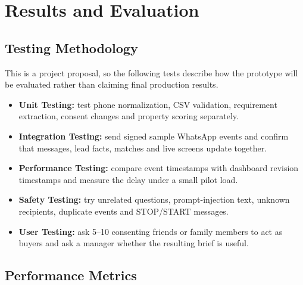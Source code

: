 \documentclass{tietreport}
\begin{document}
\chapter{Results and Evaluation}

\section{Testing Methodology}

This is a project proposal, so the following tests describe how the prototype
will be evaluated rather than claiming final production results.

\begin{itemize}
  \item \textbf{Unit Testing:} test phone normalization, CSV validation,
    requirement extraction, consent changes and property scoring separately.
  \item \textbf{Integration Testing:} send signed sample WhatsApp events and
    confirm that messages, lead facts, matches and live screens update together.
  \item \textbf{Performance Testing:} compare event timestamps with dashboard
    revision timestamps and measure the delay under a small pilot load.
  \item \textbf{Safety Testing:} try unrelated questions, prompt-injection text,
    unknown recipients, duplicate events and STOP/START messages.
  \item \textbf{User Testing:} ask 5--10 consenting friends or family members to
    act as buyers and ask a manager whether the resulting brief is useful.
\end{itemize}

\section{Performance Metrics}
\end{document}
